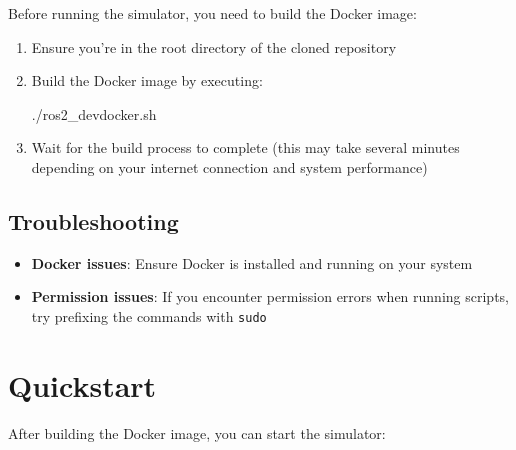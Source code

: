 \documentclass[
  letterpaper,
  DIV=11,
  numbers=noendperiod]{scrreprt}
\newenvironment{Shaded}{\begin{snugshade}}{\end{snugshade}}
\newcommand{\ExtensionTok}[1]{\textcolor[rgb]{0.00,0.23,0.31}{#1}}
\providecommand{\tightlist}{%
  \setlength{\itemsep}{0pt}\setlength{\parskip}{0pt}}\usepackage{longtable,booktabs,array}
\begin{document}

Before running the simulator, you need to build the Docker image:

\begin{enumerate}
\def\labelenumi{\arabic{enumi}.}
\item
  Ensure you're in the root directory of the cloned repository
\item
  Build the Docker image by executing:

\begin{Shaded}
\begin{Highlighting}[]
\ExtensionTok{./ros2\_devdocker.sh}
\end{Highlighting}
\end{Shaded}
\item
  Wait for the build process to complete (this may take several minutes
  depending on your internet connection and system performance)
\end{enumerate}

\section*{Troubleshooting}\label{troubleshooting}


\begin{itemize}
\tightlist
\item
  \textbf{Docker issues}: Ensure Docker is installed and running on your
  system
\item
  \textbf{Permission issues}: If you encounter permission errors when
  running scripts, try prefixing the commands with \texttt{sudo}
\end{itemize}


\chapter*{Quickstart}\label{quickstart}


After building the Docker image, you can start the simulator:
\end{document}
